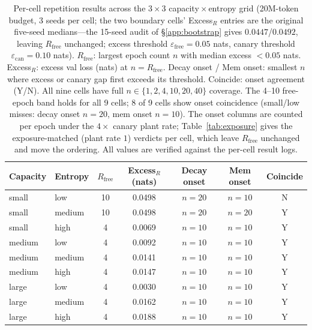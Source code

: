 \documentclass[11pt]{article}
\begin{document}
\begin{table}[htbp]
\centering
\caption{Per-cell repetition results across the $3\times3$ capacity\,$\times$\,entropy grid
(20M-token budget, 3 seeds per cell; the two boundary cells' Excess$_R$ entries are
the original five-seed medians---the 15-seed audit of \S\ref{app:bootstrap} gives
$0.0447$/$0.0492$, leaving $R_{\mathrm{free}}$ unchanged; excess threshold
$\varepsilon_{\mathrm{free}}=0.05$ nats,
canary threshold $\varepsilon_{\mathrm{can}}=0.10$ nats).
$R_{\mathrm{free}}$: largest epoch count $n$ with median excess $<0.05$ nats.
Excess$_{R}$: excess val loss (nats) at $n=R_{\mathrm{free}}$.
Decay onset / Mem onset: smallest $n$ where excess or canary gap first exceeds its threshold.
Coincide: onset agreement (Y/N).
All nine cells have full $n\in\{1,2,4,10,20,40\}$ coverage.
The 4--10 free-epoch band holds for all 9 cells; 8 of 9 cells
show onset coincidence (small/low misses: decay onset $n=20$, mem onset $n=10$).
The onset columns are counted per epoch under the $4\times$ canary plant rate;
Table~\ref{tab:exposure} gives the exposure-matched (plant rate $1$) verdicts per
cell, which leave $R_{\mathrm{free}}$ unchanged and move the ordering.
All values are verified against the per-cell result logs.}
\label{tab:cells}
\scriptsize
\begin{tabular}{@{}llccccc@{}}
\toprule
Capacity & Entropy & $R_{\mathrm{free}}$ & Excess$_{R}$ (nats) & Decay onset & Mem onset & Coincide \\
\midrule
small & low    & 10 & 0.0498 & $n=20$ & $n=10$ & N \\
small & medium & 10 & 0.0498 & $n=20$ & $n=20$ & Y \\
small & high   &  4 & 0.0069 & $n=10$ & $n=10$ & Y \\
\midrule
medium & low    & 4 & 0.0092 & $n=10$ & $n=10$ & Y \\
medium & medium & 4 & 0.0141 & $n=10$ & $n=10$ & Y \\
medium & high   & 4 & 0.0147 & $n=10$ & $n=10$ & Y \\
\midrule
large & low    & 4 & 0.0030 & $n=10$ & $n=10$ & Y \\
large & medium & 4 & 0.0162 & $n=10$ & $n=10$ & Y \\
large & high   & 4 & 0.0188 & $n=10$ & $n=10$ & Y \\
\bottomrule
\end{tabular}
\end{table}
\end{document}
